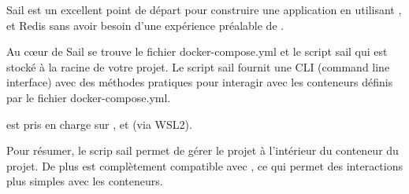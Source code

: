     Sail est un excellent point de départ pour construire une application \laravel{} en utilisant \php{}, \mysql et Redis sans avoir besoin d'une expérience préalable de \docker{}.

    Au cœur de Sail se trouve le fichier docker-compose.yml et le script sail qui est stocké à la racine de votre projet. Le script sail fournit une CLI (command line interface) avec des méthodes pratiques pour interagir avec les conteneurs \docker{} définis par le fichier docker-compose.yml.

    \laravelsail{} est pris en charge sur \macos{}, \linux{} et \windows{} (via WSL2).

    Pour résumer, le scrip sail permet de gérer le projet \laravel{} à l'intérieur du conteneur du projet. De plus \laravelsail{} est complètement compatible avec \docker{}, ce qui permet des interactions plus simples avec les conteneurs.
